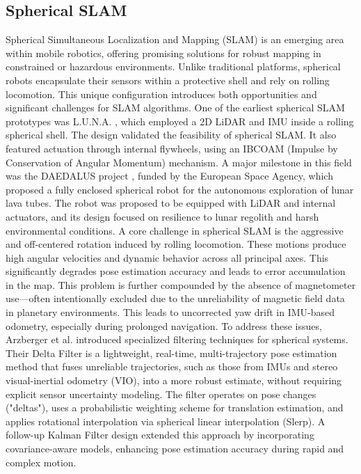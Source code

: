 \documentclass[a4paper, conference]{IEEEtran}
\begin{document}
\subsection{Spherical SLAM}\label{AA}
Spherical Simultaneous Localization and Mapping (SLAM) is an emerging area within mobile robotics, offering promising solutions for robust mapping in constrained or hazardous environments. 
Unlike traditional platforms, spherical robots encapsulate their sensors within a protective shell and rely on rolling locomotion. 
This unique configuration introduces both opportunities and significant challenges for SLAM algorithms. 
One of the earliest spherical SLAM prototypes was L.U.N.A. \cite{luna}, which employed a 2D LiDAR and IMU inside a rolling spherical shell. 
The design validated the feasibility of spherical SLAM. 
It also featured actuation through internal flywheels, using an IBCOAM (Impulse by Conservation of Angular Momentum) mechanism.
A major milestone in this field was the DAEDALUS project \cite{DAEDALUS}, funded by the European Space Agency, which proposed a fully enclosed spherical robot for the autonomous exploration of lunar lava tubes. 
The robot was proposed to be equipped with LiDAR and internal actuators, and its design focused on resilience to lunar regolith and harsh environmental conditions.
A core challenge in spherical SLAM is the aggressive and off-centered rotation induced by rolling locomotion. 
These motions produce high angular velocities and dynamic behavior across all principal axes. 
This significantly degrades pose estimation accuracy and leads to error accumulation in the map. 
This problem is further compounded by the absence of magnetometer use—often intentionally excluded due to the unreliability of magnetic field data in planetary environments.
This leads to uncorrected yaw drift in IMU-based odometry, especially during prolonged navigation.
To address these issues, Arzberger et al. \cite{Kalman_filter_sphere,sphere_Fabi_1,DeltaFilter} introduced specialized filtering techniques for spherical systems. 
Their Delta Filter is a lightweight, real-time, multi-trajectory pose estimation method that fuses unreliable trajectories, such as those from IMUs and stereo visual-inertial odometry (VIO), into a more robust estimate, without requiring explicit sensor uncertainty modeling. 
The filter operates on pose changes ("deltas"), uses a probabilistic weighting scheme for translation estimation, and applies rotational interpolation via spherical linear interpolation (Slerp). 
A follow-up Kalman Filter design extended this approach by incorporating covariance-aware models, enhancing pose estimation accuracy during rapid and complex motion.
\end{document}
